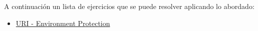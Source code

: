 A continuación un lista de ejercicios que se puede resolver aplicando lo abordado:

\begin{itemize}
	\item \href{https://www.urionlinejudge.com.br/judge/en/problems/view/1297}{URI - Environment Protection}
\end{itemize}